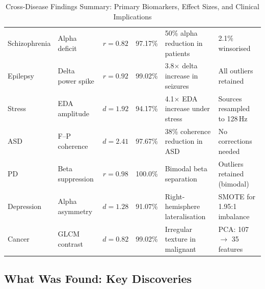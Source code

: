 \begin{xltabular}
{\textwidth}{@{} L L c c L L @{}}
\caption[Cross-disease findings]{Cross-Disease Findings Summary: Primary Biomarkers, Effect Sizes, and Clinical Implications}
\label{tab:cross_disease_findings}\\
\toprule
{} &  &  &  &  &  \\
\midrule
\endfirsthead
\endhead
\bottomrule
\endlastfoot
Schizophrenia & Alpha deficit & $r = 0.82$ & 97.17\% & 50\% alpha reduction in patients & 2.1\% winsorised \\
\addlinespace
Epilepsy & Delta power spike & $r = 0.92$ & 99.02\% & 3.8$\times$ delta increase in seizures & All outliers retained \\
\addlinespace
Stress & EDA amplitude & $d = 1.92$ & 94.17\% & 4.1$\times$ EDA increase under stress & Sources resampled to 128\,Hz \\
\addlinespace
ASD & F--P coherence & $d = 2.41$ & 97.67\% & 38\% coherence reduction in ASD & No corrections needed \\
\addlinespace
PD & Beta suppression & $r = 0.98$ & 100.0\% & Bimodal beta separation & Outliers retained (bimodal) \\
\addlinespace
Depression & Alpha asymmetry & $d = 1.28$ & 91.07\% & Right-hemisphere lateralisation & SMOTE for 1.95:1 imbalance \\
\addlinespace
Cancer & GLCM contrast & $d = 0.82$ & 99.02\% & Irregular texture in malignant & PCA: 107 $\to$ 35 features \\
\end{xltabular}
\endgroup

\subsection{What Was Found: Key Discoveries}

